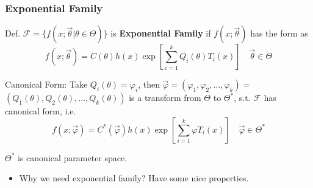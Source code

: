 \documentclass[11pt,a4paper]{ctexart}
\numberwithin{equation}{section}%
\begin{document}
    \subsubsection{Exponential Family}\label{SubSectionExponentialFamily}
        Def. $\mathscr{F}=\{f(x;\vec{\theta}|\theta\in\Theta)\}$ is \textbf{Exponential Family} if $f(x;\vec{\theta})$ has the form as
\[
    f(x;\vec{\theta})=C(\theta)h(x)\exp \left[  \sum_{i=1}^k Q_i(\theta)T_i(x) \right]\quad\vec{\theta}\in\Theta
\]    

    Canonical Form: Take $Q_i(\theta)=\varphi_i$, then $\vec{\varphi}=(\varphi_1,\varphi_2,\ldots,\varphi_k)=$$(Q_1(\theta),Q_2(\theta),\ldots,Q_k(\theta))$ is a transform from $\Theta$ to $\Theta^*$, s.t. $\mathscr{F}$ has canonical form, i.e.
    \[
        f(x;\vec{\varphi})=C^*(\vec{\varphi})h(x)   \exp\left[  \sum_{i=1}^k \varphi T_i(x) \right] \quad \vec{\varphi}\in\Theta^*
    \]

    $\Theta^*$ is canonical parameter space.

    \begin{itemize}
        \item Why we need exponential family? Have some nice properties.
    \end{itemize}
\end{document}
